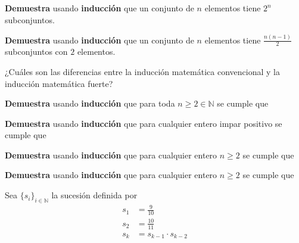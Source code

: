\documentclass[oneside]{style}
\begin{document}
\begin{questions}[label=\protect\circled{\bfseries\arabic*}]
    \question
    {
        \textbf{Demuestra} usando \textbf{inducción} que un conjunto de $n$ 
        elementos tiene $2^n$ subconjuntos. 
    }

    \question
    {
        \textbf{Demuestra} usando \textbf{inducción} que un conjunto de $n$ 
        elementos tiene $\frac{n(n-1)}{2}$ subconjuntos con $2$ elementos. 
    }

    \question
    {
        ¿Cuáles son las diferencias entre la inducción matemática convencional 
        y la inducción matemática fuerte?
    }

    \question
    {
        \textbf{Demuestra} usando \textbf{inducción} que para toda 
        $n \geq 2 \in \mathbb{N}$ se cumple que
        \begin{center}
        \end{center}
    }

    \question
    {
        \textbf{Demuestra} usando \textbf{inducción} que para cualquier 
        entero impar positivo se cumple que 
        \begin{center}
        \end{center}
    }

    \question
    {
        \textbf{Demuestra} usando \textbf{inducción} que para cualquier 
        entero $n \geq 2$ se cumple que 
        \begin{center}
        \end{center}
    }

    \question
    {
        \textbf{Demuestra} usando \textbf{inducción} que para cualquier entero 
        $n \geq 2$ se cumple que 
        \begin{center}
        \end{center}
    }

    \question
    {
        Sea $\{s_i\}_{i \in \mathbb{N}}$ la sucesión definida por 
        \begin{align*}
            s_1 &= \frac{9}{10} \\
            s_2 &= \frac{10}{11} \\  
            s_{k} &= s_{k-1} \cdot s_{k-2} 
        \end{align*}

}
\end{questions}
\end{document}
